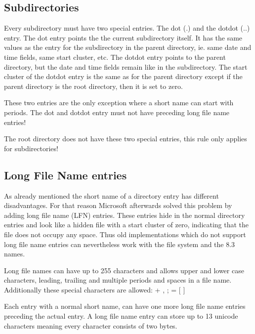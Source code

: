 \subsection{Subdirectories}

Every subdirectory must have two special entries. The dot (.) and the dotdot (..) entry. The dot entry points the the current subdirectory itself. It has the same values as the entry for the subdirectory in the parent directory, ie. same date and time fields, same start cluster, etc. The dotdot entry points to the parent directory, but the date and time fields remain like in the subdirectory. The start cluster of the dotdot entry is the same as for the parent directory except if the parent directory is the root directory, then it is set to zero.

These two entries are the only exception where a short name can start with periods. The dot and dotdot entry must not have preceding long file name entries!

The root directory does not have these two special entries, this rule only applies for subdirectories!

\subsection{Long File Name entries}

As already mentioned the short name of a directory entry has different disadvantages. For that reason Microsoft afterwards solved this problem by adding long file name (LFN) entries. These entries hide in the normal directory entries and look like a hidden file with a start cluster of zero, indicating that the file does not occupy any space. Thus old implementations which do not support long file name entries can nevertheless work with the file system and the 8.3 names.

Long file names can have up to 255 characters and allows upper and lower case characters, leading, trailing and multiple periods and spaces in a file name\cite{usb_ms_jan}. Additionally these special characters are allowed\cite{fatgen103}: + , ; = [ ] 

Each entry with a normal short name, can have one more long file name entries preceding the actual entry. A long file name entry can store up to 13 unicode characters meaning every character consists of two bytes.


